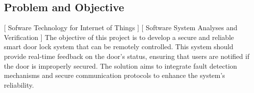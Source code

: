 \subsection{Problem and Objective}
[ Sofware Technology for Internet of Things ] [ Software System Analyses and Verification ]
\newline
The objective of this project is to develop a secure and reliable smart door lock system that can be remotely controlled. This system should provide real-time feedback on the door's status, ensuring that users are notified if the door is improperly secured. The solution aims to integrate fault detection mechanisms and secure communication protocols to enhance the system's reliability.
